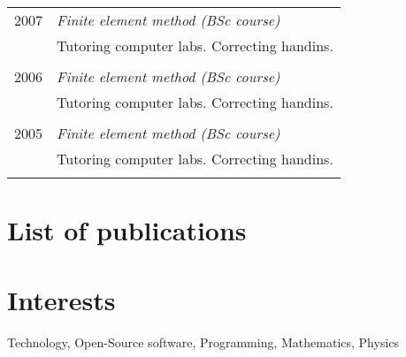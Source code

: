 \documentclass[a4paper,10pt]{article} %
\begin{document}
\begin{tabular}{r|p{11cm}}

\textsc{2007} & \emph{Finite element method (BSc course)}\\ 
& \footnotesize{Tutoring computer labs. Correcting handins.}\\
\multicolumn{2}{c}{} \\


\textsc{2006} & \emph{Finite element method (BSc course)}\\ 
& \footnotesize{Tutoring computer labs. Correcting handins.}\\
\multicolumn{2}{c}{} \\


\textsc{2005} & \emph{Finite element method (BSc course)}\\ 
& \footnotesize{Tutoring computer labs. Correcting handins.}\\
\multicolumn{2}{c}{} \\


\end{tabular}


\section{List of publications}




\section{Interests}

Technology, Open-Source software, Programming, Mathematics, Physics\\

\end{document}
